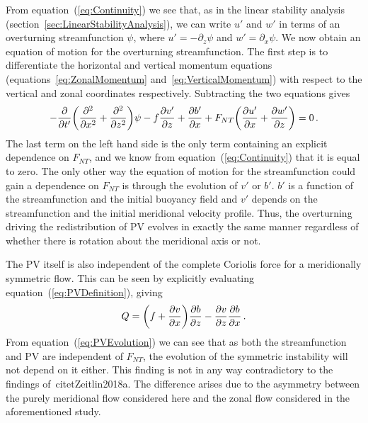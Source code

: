     From equation~(\ref{eq:Continuity}) we see that, as in the linear stability analysis (section~\ref{sec:LinearStabilityAnalysis}), we can write $u'$ and $w'$ in terms of an overturning streamfunction $\psi$, where $u' = - \partial_z \psi$ and $w' = \partial_x \psi$. We now obtain an equation of motion for the overturning streamfunction. The first step is to differentiate the horizontal and vertical momentum equations (equations~\ref{eq:ZonalMomentum} and~\ref{eq:VerticalMomentum}) with respect to the vertical and zonal coordinates respectively. Subtracting the two equations gives
    \begin{equation}
        -\pdv{t'} \bigg( \pdv[2]{x} + \pdv[2]{z} \bigg) \psi - f \pdv{v'}{z} + \pdv{b'}{x} + F_{NT} \bigg( \pdv{u'}{x} + \pdv{w'}{z} \bigg) = 0 \, .
    \end{equation}
    The last term on the left hand side is the only term containing an explicit dependence on $F_{NT}$, and we know from equation~(\ref{eq:Continuity}) that it is equal to zero. The only other way the equation of motion for the streamfunction could gain a dependence on $F_{NT}$ is through the evolution of $v'$ or $b'$. $b'$ is a function of the streamfunction and the initial buoyancy field and $v'$ depends on the streamfunction and the initial meridional velocity profile. Thus, the overturning driving the redistribution of PV evolves in exactly the same manner regardless of whether there is rotation about the meridional axis or not.

    The PV itself is also independent of the complete Coriolis force for a meridionally symmetric flow. This can be seen by explicitly evaluating equation~(\ref{eq:PVDefinition}), giving
    \begin{equation}
        Q = \bigg( f + \pdv{v}{x} \bigg) \pdv{b}{z} - \pdv{v}{z} \pdv{b}{x} \, .
    \end{equation}
    From equation~(\ref{eq:PVEvolution}) we can see that as both the streamfunction and PV are independent of $F_{NT}$, the evolution of the symmetric instability will not depend on it either. This finding is not in any way contradictory to the findings of~citet{Zeitlin2018a}. The difference arises due to the asymmetry between the purely meridional flow considered here and the zonal flow considered in the aforementioned study.

